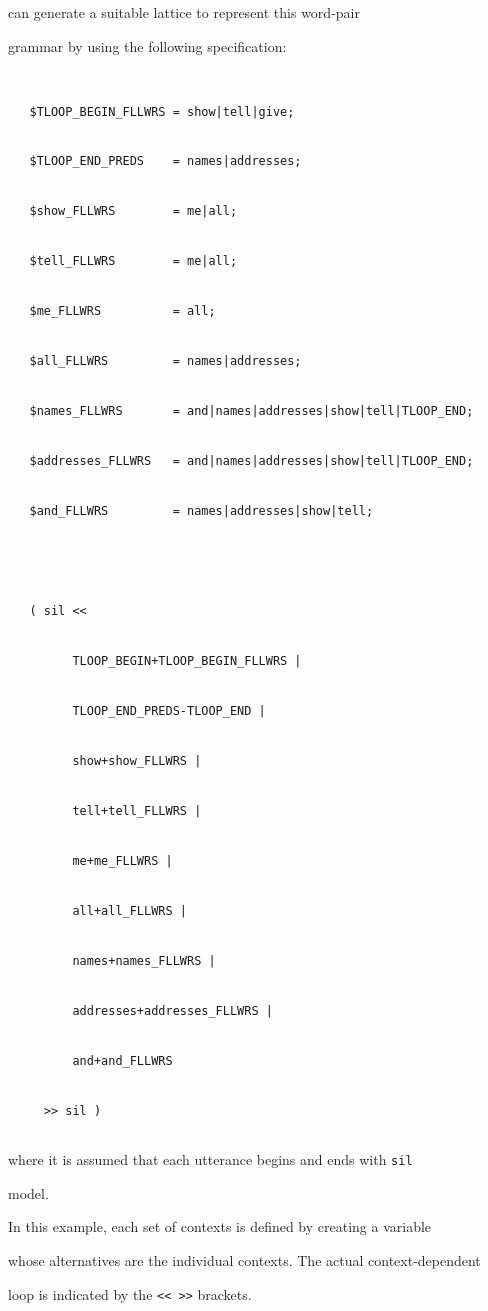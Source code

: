 can generate a suitable lattice to represent this word-pair


grammar by using the following specification:


\begin{verbatim}


   $TLOOP_BEGIN_FLLWRS = show|tell|give;


   $TLOOP_END_PREDS    = names|addresses;


   $show_FLLWRS        = me|all;


   $tell_FLLWRS        = me|all;


   $me_FLLWRS          = all;


   $all_FLLWRS         = names|addresses;


   $names_FLLWRS       = and|names|addresses|show|tell|TLOOP_END;


   $addresses_FLLWRS   = and|names|addresses|show|tell|TLOOP_END;


   $and_FLLWRS         = names|addresses|show|tell;


     


   ( sil << 


         TLOOP_BEGIN+TLOOP_BEGIN_FLLWRS |


         TLOOP_END_PREDS-TLOOP_END |


         show+show_FLLWRS |


         tell+tell_FLLWRS |


         me+me_FLLWRS |


         all+all_FLLWRS |


         names+names_FLLWRS |


         addresses+addresses_FLLWRS |


         and+and_FLLWRS 


     >> sil )     


\end{verbatim}


where it is assumed that each utterance begins and ends with \texttt{sil}


model. 





In this example, each set of contexts is defined by creating a variable


whose alternatives are the individual contexts.  The actual context-dependent


 loop is indicated by the \texttt{<<  >>} brackets.  


